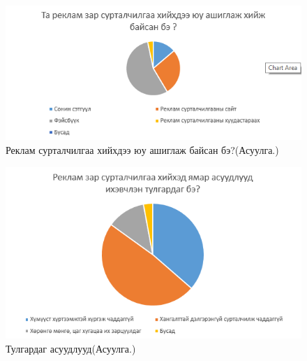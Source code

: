 \begin{figure}[htbp]
	\centering
	\includegraphics[scale=0.7]{Chart/Chart2}
	\caption[Хэрэглэгчийн судалгаа]{Реклам сурталчилгаа хийхдээ юу ашиглаж байсан бэ?(Асуулга.)}
	\label{fig:Chart2}
\end{figure}

\begin{figure}[htbp]
	\centering
	\includegraphics[scale=0.7]{Chart/Chart3}
	\caption[Хэрэглэгчийн судалгаа]{Тулгардаг асуудлууд(Асуулга.)}
	\label{fig:Chart3}
\end{figure}

